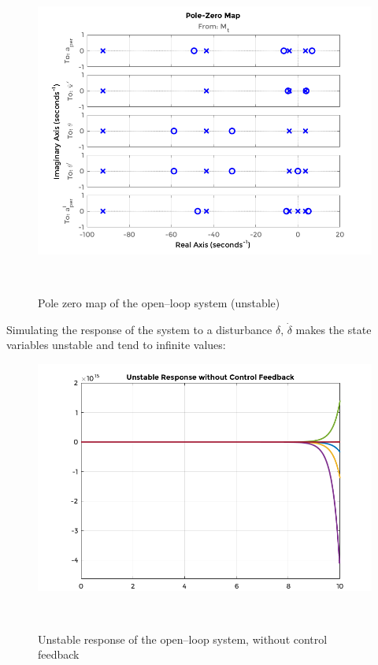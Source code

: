 \newpage
\begin{figure}[!h]
	\includegraphics[width=1.15\linewidth]{figs/06/control/pole_zero_map_1}
	\caption{Pole zero map of the open--loop system (unstable)}
	\label{pole_zero_map_1}
	\\[-1cm]
\end{figure}

Simulating the response of the system to a disturbance $\delta,\,\dot{\delta}$ makes the state variables unstable and tend to infinite values:

\begin{figure}[!h]
	\includegraphics[width=1.15\linewidth]{figs/06/control/response_1}
	\caption{Unstable response of the open--loop system, without control feedback}
	\label{response_1}
	\\[-1.3cm]
\end{figure}

